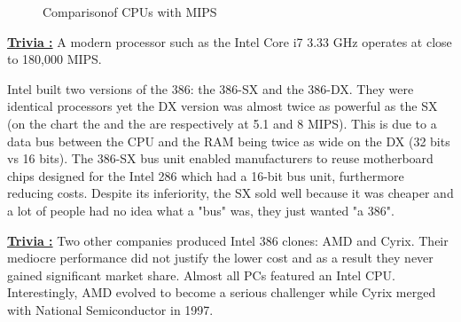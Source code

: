 \documentclass[book.tex]{subfiles}
\begin{document}
\begin{figure}[H]
\centering
   \caption{Comparison\protect\footnotemark of CPUs with MIPS}
 \end{figure}
 \par
 \par
  \textbf{\underline{Trivia :}} A modern processor such as the Intel Core i7 3.33 GHz operates at close to 180,000 MIPS.\\
  \par
 Intel built two versions of the 386: the 386-SX and the 386-DX. They were identical processors yet the DX version was almost twice as powerful as the SX (on the chart the  and the  are respectively at 5.1 and 8 MIPS). This is due to a data bus between the CPU and the RAM being twice as wide on the DX (32 bits vs 16 bits). The 386-SX bus unit enabled manufacturers to reuse motherboard chips designed for the Intel 286 which had a 16-bit bus unit, furthermore reducing costs. Despite its inferiority, the SX sold well because it was cheaper and a lot of people had no idea what a "bus" was, they just wanted "a 386".\\



 \par
\textbf{\underline{Trivia :}} Two other companies produced Intel 386 clones: AMD and Cyrix. Their mediocre performance did not justify the lower cost and as a result they never gained significant market share. Almost all PCs featured an Intel CPU. Interestingly, AMD evolved to become a serious challenger while Cyrix merged with National Semiconductor in 1997.\\
\par
\end{document}
